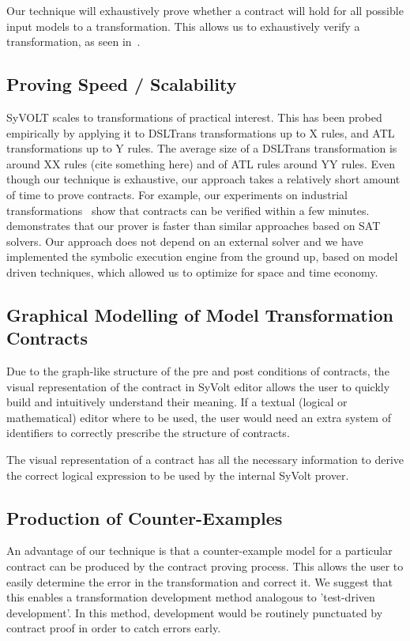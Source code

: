 Our technique will exhaustively prove whether a contract will hold for all
possible input models to a transformation. This allows us to exhaustively verify
a transformation, as seen in~\cite{Lucio2014}.

\subsection{Proving Speed / Scalability}

SyVOLT scales to transformations of practical interest. This has been probed
empirically by applying it to DSLTrans transformations up to X rules, and ATL
transformations up to Y rules. The average size of a DSLTrans transformation is
around XX rules (cite something here) and of ATL rules around YY rules. Even
though our technique is exhaustive, our approach takes a relatively short amount
of time to prove contracts. For example, our experiments on industrial
transformations~\cite{Oakes} show that contracts can be verified within a few
minutes. \cite{Selim2014} demonstrates that our prover is faster than similar
approaches based on SAT solvers. Our approach does not depend on an external
solver and we have implemented the symbolic execution engine from the ground up,
based on model driven techniques, which allowed us to optimize for space and
time economy.

\subsection{Graphical Modelling of Model Transformation Contracts}

Due to the graph-like structure of the pre and post conditions of contracts, the
visual representation of the contract in SyVolt editor allows the user to
quickly build and intuitively understand their meaning.
If a textual (logical or mathematical) editor where to be used, the user would
need an extra system of identifiers to correctly prescribe the structure of contracts.

The visual representation of a contract has all the necessary information to derive the correct 
logical expression to be used by the internal SyVolt prover.

\subsection{Production of Counter-Examples}

An advantage of our technique is that a counter-example model for a particular
contract can be produced by the contract proving process. This allows the user
to easily determine the error in the transformation and correct it. We suggest
that this enables a transformation development method analogous to 'test-driven
development'. In this method, development would be routinely punctuated by
contract proof in order to catch errors early.

